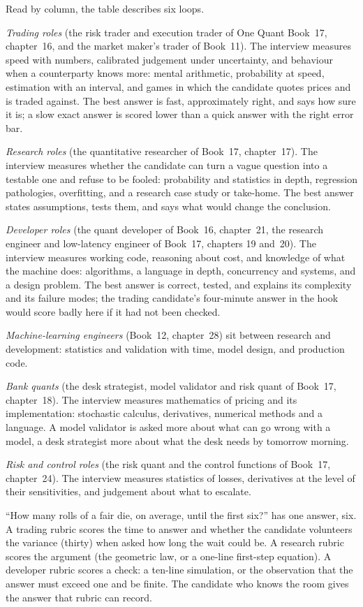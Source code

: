 Read by column, the table describes six loops.

\emph{Trading roles} (the risk trader and execution trader of One Quant Book~17, chapter~16, and the market
maker's trader of Book~11). The interview measures speed with numbers, calibrated judgement under uncertainty,
and behaviour when a counterparty knows more: mental arithmetic, probability at speed, estimation with an
interval, and games in which the candidate quotes prices and is traded against. The best answer is fast,
approximately right, and says how sure it is; a slow exact answer is scored lower than a quick answer with
the right error bar.

\emph{Research roles} (the quantitative researcher of Book~17, chapter~17). The interview measures whether the
candidate can turn a vague question into a testable one and refuse to be fooled: probability and statistics in
depth, regression pathologies, overfitting, and a research case study or take-home. The best answer states
assumptions, tests them, and says what would change the conclusion.

\emph{Developer roles} (the quant developer of Book~16, chapter~21, the research engineer and low-latency
engineer of Book~17, chapters 19 and~20). The interview measures working code, reasoning about cost, and
knowledge of what the machine does: algorithms, a language in depth, concurrency and systems, and a design
problem. The best answer is correct, tested, and explains its complexity and its failure modes; the trading
candidate's four-minute answer in the hook would score badly here if it had not been checked.

\emph{Machine-learning engineers} (Book~12, chapter~28) sit between research and development: statistics and
validation with time, model design, and production code.

\emph{Bank quants} (the desk strategist, model validator and risk quant of Book~17, chapter~18). The interview
measures mathematics of pricing and its implementation: stochastic calculus, derivatives, numerical methods and
a language. A model validator is asked more about what can go wrong with a model, a desk strategist more about
what the desk needs by tomorrow morning.

\emph{Risk and control roles} (the risk quant and the control functions of Book~17, chapter~24). The interview
measures statistics of losses, derivatives at the level of their sensitivities, and judgement about what to
escalate.

\begin{remark}\label{rem:iv:what-each-interview-tests-by-role:rubrics}
``How many rolls of a fair die, on average, until the first six?'' has one answer, six. A trading rubric
scores the time to answer and whether the candidate volunteers the variance (thirty) when asked how long the
wait could be. A research rubric scores the argument (the geometric law, or a one-line first-step equation).
A developer rubric scores a check: a ten-line simulation, or the observation that the answer must exceed
one and be finite. The candidate who knows the room gives the answer that rubric can record.
\end{remark}

